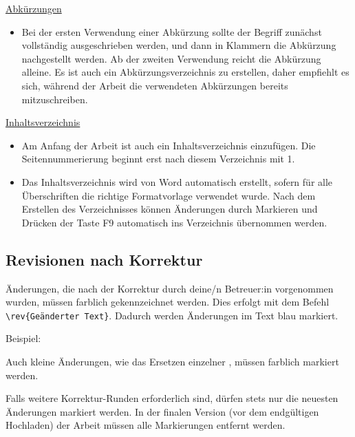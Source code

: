 
\underline{Abkürzungen}
\begin{itemize}
    \item Bei der ersten Verwendung einer Abkürzung sollte der Begriff zunächst vollständig ausgeschrieben werden, und dann in Klammern die Abkürzung nachgestellt werden. Ab der zweiten Verwendung reicht die Abkürzung alleine. Es ist auch ein Abkürzungsverzeichnis zu erstellen, daher empfiehlt es sich, während der Arbeit die verwendeten Abkürzungen bereits mitzuschreiben.
\end{itemize}

\vspace{5mm}

\underline{Inhaltsverzeichnis}
\begin{itemize}
    \item Am Anfang der Arbeit ist auch ein Inhaltsverzeichnis einzufügen. Die Seitennummerierung beginnt erst nach diesem Verzeichnis mit 1.
    \item Das Inhaltsverzeichnis wird von Word automatisch erstellt, sofern für alle Überschriften die richtige Formatvorlage verwendet wurde. Nach dem Erstellen des Verzeichnisses können Änderungen durch Markieren und Drücken der Taste F9 automatisch ins Verzeichnis übernommen werden.
\end{itemize}


\subsection{Revisionen nach Korrektur}

Änderungen, die nach der Korrektur durch deine/n Betreuer:in vorgenommen wurden, müssen farblich gekennzeichnet werden. Dies erfolgt mit dem Befehl \verb|\rev{Geänderter Text}|. Dadurch werden Änderungen im Text blau markiert.

Beispiel:\\

Auch kleine Änderungen, wie das Ersetzen einzelner , müssen farblich markiert werden.

Falls weitere Korrektur-Runden erforderlich sind, dürfen stets nur die neuesten Änderungen markiert werden. In der finalen Version (vor dem endgültigen Hochladen) der Arbeit müssen alle Markierungen entfernt werden.

\newpage